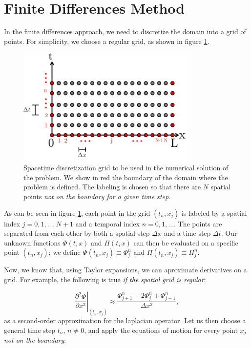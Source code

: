 \documentclass{article}
\begin{document}
\section{Finite Differences Method}

In the finite differences approach, we need to discretize the domain into a grid of points. For simplicity, we choose a regular grid, as shown in figure \ref{fig1}.

\begin{figure}[H]
\centering
\includegraphics[width=0.8\textwidth]{figgrid}
\caption{\label{fig1}Spacetime discretization grid to be used in the numerical solution of the problem. We show in red the boundary of the domain where the problem is defined. The labeling is chosen so that there are $N$ spatial points \textit{not on the boundary for a given time step}.}
\end{figure}

As can be seen in figure \ref{fig1}, each point in the grid $(t_n,x_j)$ is labeled by a spatial index $j=0,1,..., N+1$ and a temporal index $n=0,1,...$. The points are separated from each other by both a spatial step $\Delta x$ and a time step $\Delta t$. Our unknown functions $\Phi(t,x)$ and $\Pi(t,x)$ can then be evaluated on a specific point $(t_n,x_j)$; we define $\Phi(t_n,x_j)\equiv \Phi^n_j$ and $\Pi(t_n,x_j)\equiv \Pi^n_j$.

Now, we know that, using Taylor expansions, we can aproximate derivatives on a grid. For example, the following is true \textit{if the spatial grid is regular}:

\begin{equation}\label{te}
\left.\frac{\partial^2 \Phi}{\partial x^2}\right|_{(t_n,x_j)}\approx\frac{\Phi^n_{j+1}-2\Phi^n_j+\Phi^n_{j-1}}{\Delta x^2},
\end{equation}
as a second-order approximation for the laplacian operator. Let us then choose a general time step $t_n$, $n\neq0$, and apply the equations of motion for every point $x_j$ \textit{not on the boundary}:
\end{document}
